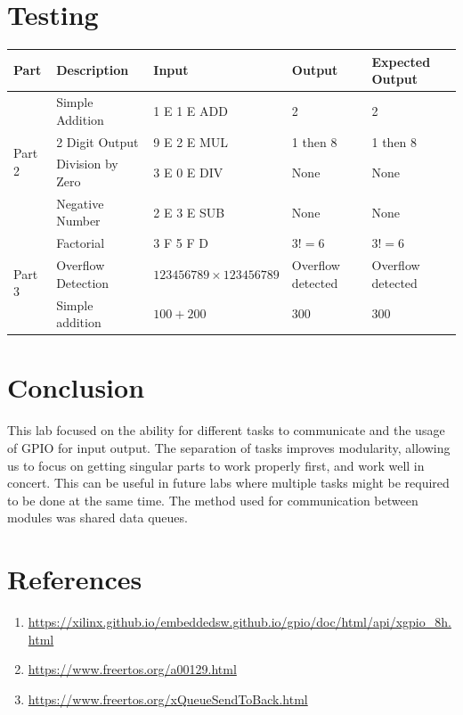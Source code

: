 \documentclass{article}
\begin{document}
\section{Testing}
\begin{table}[H]
    \centering
    \begin{tabular}{lllll}
        \toprule
        Part                    & Description        & Input                          & Output            & Expected Output   \\
        \midrule
        \multirow{4}{*}{Part 2} & Simple Addition    & 1 E 1 E ADD                    & 2                 & 2                 \\
                                & 2 Digit Output     & 9 E 2 E MUL                    & 1 then 8          & 1 then 8          \\
                                & Division by Zero   & 3 E 0 E DIV                    & None              & None              \\
                                & Negative Number    & 2 E 3 E SUB                    & None              & None              \\
        \midrule
        \multirow{3}{*}{Part 3} & Factorial          & 3 F 5 F D                      & \(3! = 6\)        & \(3! = 6\)        \\
                                & Overflow Detection & \(123456789 \times 123456789\) & Overflow detected & Overflow detected \\
                                & Simple addition    & \(100 + 200\)                  & 300               & 300               \\
        \bottomrule
    \end{tabular}
\end{table}
\section{Conclusion}
This lab focused on the ability for different tasks to communicate and the usage of GPIO for input output. The separation of tasks improves modularity, allowing us to focus on getting singular parts to work properly first, and work well in concert. This can be useful in future labs where multiple tasks might be required to be done at the same time. The method used for communication between modules was shared data queues.

\section{References}
\begin{enumerate}
    \item \url{https://xilinx.github.io/embeddedsw.github.io/gpio/doc/html/api/xgpio_8h.html}
    \item \url{https://www.freertos.org/a00129.html}
    \item \url{https://www.freertos.org/xQueueSendToBack.html}
\end{enumerate}
\newpage
\appendix
\end{document}
